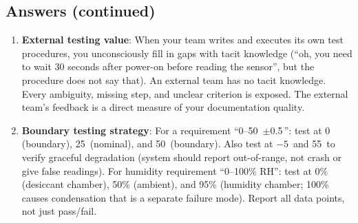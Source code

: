 \subsection{Answers (continued)}
\begin{enumerate}[leftmargin=1.5em, start=6]
\item \textbf{External testing value}: When your team writes and executes its own test procedures, you unconsciously fill in gaps with tacit knowledge (``oh, you need to wait 30 seconds after power-on before reading the sensor'', but the procedure does not say that). An external team has no tacit knowledge. Every ambiguity, missing step, and unclear criterion is exposed. The external team's feedback is a direct measure of your documentation quality.

\item \textbf{Boundary testing strategy}: For a requirement ``0--50\,\degC{} $\pm$0.5\,\degC{}'': test at 0\,\degC{} (boundary), 25\,\degC{} (nominal), and 50\,\degC{} (boundary). Also test at $-5$\,\degC{} and 55\,\degC{} to verify graceful degradation (system should report out-of-range, not crash or give false readings). For humidity requirement ``0--100\% RH'': test at 0\% (desiccant chamber), 50\% (ambient), and 95\% (humidity chamber; 100\% causes condensation that is a separate failure mode). Report all data points, not just pass/fail.
\end{enumerate}

